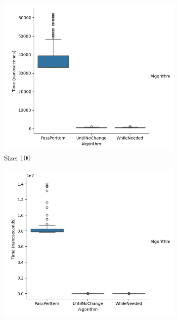 \documentclass{article}
\begin{document}
\begin{figure}[ht]
  \centering
  \begin{subfigure}{0.3\textwidth}
    \centering
    \includegraphics[width=\linewidth]{../figureByteAsc100.png}
    \caption{Size: 100}
    \label{fig:img1}
  \end{subfigure}
  \begin{subfigure}{0.3\textwidth}
    \centering
    \includegraphics[width=\linewidth]{../figureByteAsc1000.png}

\end{subfigure}
\end{figure}
\end{document}
